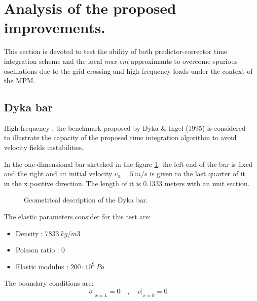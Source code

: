 
\section{Analysis of the proposed improvements.}
\label{sec:Analysis-proposed-improvements.}

This section is devoted to test the ability of both predictor-corrector
time integration scheme and the local \textit{max-ent} approximants to
overcome spurious oscillations due to the grid crossing and high
frequency loads under the context of the MPM.

\subsection{Dyka bar}
\label{sec:dyka-bar}

High frequency , the benchmark proposed by Dyka \& Ingel
(1995)\cite{Dyka1995} is considered to illustrate the
capacity of the proposed time integration algorithm to avoid velocity
fields instabilities.

In the one-dimensional bar sketched in the figure \ref{fig:Dyka_Bar},
the left end of the bar is fixed and the right and an initial velocity
$v_0 = 5\ m/s$ is given to the last quarter of it in the x positive
direction. The length of it is 0.1333 meters with an unit section.

\begin{figure}\sidecaption
  \centering
  \resizebox{\hsize}{!}{
    }
  \caption{Geometrical description of the Dyka \cite{Dyka1995} bar.}
  \label{fig:Dyka_Bar}
\end{figure}

The elastic parameters consider for this test are:
\begin{itemize} 
\item  Density : $7833\ kg/m3$
\item  Poisson ratio : $0$
\item  Elastic modulus : $200 \cdot 10^9\ Pa$
\end{itemize}

The boundary conditions are:
\begin{equation}
  \label{eq:3}
  \sigma \rvert_{x=L} = 0 \quad , \quad v \rvert_{x=0} = 0
\end{equation}

